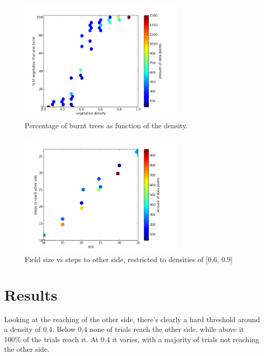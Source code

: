 \documentclass[a4paper]{report}
\begin{document}
\begin{figure}[htbp]
    \centering
    \includegraphics[width=0.7\textwidth]{./density_vs_burnt.png}
    \caption{Percentage of burnt trees as function of the density.}
    \label{fig:burnt}
\end{figure}

\begin{figure}[htbp]
    \centering
    \includegraphics[width=0.7\textwidth]{./size_vs_steps.png}
    \caption{Field size vs steps to other side, restricted to densities of [0.6,
    \label{fig:size}
0.9]}
\end{figure}



\section{Results} 
\label{sec:ff_results}

Looking at the reaching of the other side, there's clearly a hard threshold
around a density of $0.4$. Below $0.4$ none of trials reach the other side, while
above it 100\% of the trials reach it. At $0.4$ it varies, with a majority of
trials not reaching the other side.
\end{document}
